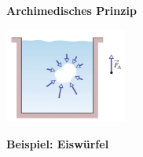 \documentclass[11pt]{article}
\begin{document}
\vspace{3cm}

\begin{tcolorbox}[width=\textwidth, %
    colback=white,colframe=gray!75!black]
    \textbf{Archimedisches Prinzip}
    \begin{flushright}
        \includegraphics[width=0.3\textwidth]{images/Archimedisches_Prinzip.png}
    \end{flushright}

    \vspace{1cm}
\end{tcolorbox}


\newpage


\textbf{Beispiel: Eiswürfel}
\end{document}
